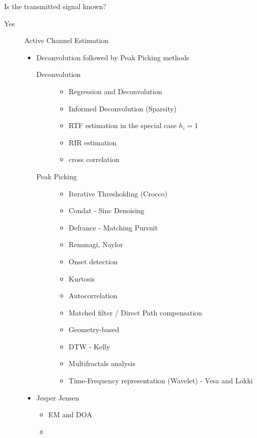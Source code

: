 Is the transmitted signal known?
\begin{description}
    \item[Yes] Active Channel Estimation
    \begin{itemize}
        \item Deconvolution followed by Peak Picking methods
        \begin{description}
            \item[Deconvolution]
            \begin{itemize}
                \item Regression and Deconvolution
                \item Informed Deconvolution (Sparsity)
                \item RTF estimation in the special case $h_i = 1$
                \item RIR estimation 
                \item cross correlation
            \end{itemize}
            \item[Peak Picking]
            \begin{itemize}
                \item Iterative Thresholding (Crocco)
                \item Condat - Sinc Denoising
                \item Defrance - Matching Pursuit
                \item Remmagi, Naylor
                \item Onset detection
                \item Kurtosis
                \item Autocorrelation
                \item Matched filter / Direct Path compensation
                \item Geometry-based
                \item DTW - Kelly
                \item Multifractals analysis
                \item Time-Frequency representation (Wavelet) - Vesa and Lokki
            \end{itemize}
        \end{description}
        \item Jesper Jensen
        \begin{itemize}
            \item EM and DOA
            \item \cite{crocco2014towards}

\end{itemize}
\end{itemize}
\end{description}
